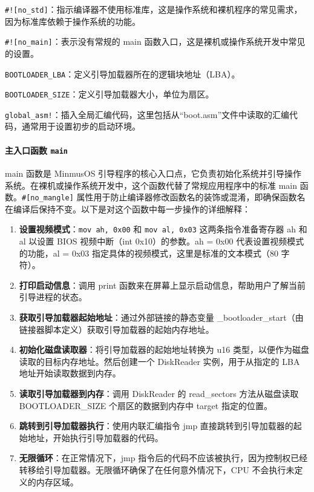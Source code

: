 \texttt{\#![no\_std]}：指示编译器不使用标准库，这是操作系统和裸机程序的常见需求，因为标准库依赖于操作系统的功能。

\texttt{\#![no\_main]}：表示没有常规的 main 函数入口，这是裸机或操作系统开发中常见的设置。

\texttt{BOOTLOADER\_LBA}：定义引导加载器所在的逻辑块地址（LBA）。

\texttt{BOOTLOADER\_SIZE}：定义引导加载器大小，单位为扇区。

\texttt{global\_asm!}：插入全局汇编代码，这里包括从“boot.asm”文件中读取的汇编代码，通常用于设置初步的启动环境。

\paragraph{主入口函数 \texttt{main}}

main 函数是 MinmusOS 引导程序的核心入口点，它负责初始化系统并引导操作系统。在裸机或操作系统开发中，这个函数代替了常规应用程序中的标准 main 函数。\texttt{\#[no\_mangle]} 属性用于防止编译器修改函数名的装饰或混淆，即确保函数名在编译后保持不变。以下是对这个函数中每一步操作的详细解释：

\begin{enumerate}
    \item \textbf{设置视频模式}：\texttt{mov ah, 0x00} 和 \texttt{mov al, 0x03} 这两条指令准备寄存器 ah 和 al 以设置 BIOS 视频中断（int 0x10）的参数。ah = 0x00 代表设置视频模式的功能，al = 0x03 指定具体的视频模式，这里是标准的文本模式（80  字符）。
    \item \textbf{打印启动信息}：调用 print 函数来在屏幕上显示启动信息，帮助用户了解当前引导进程的状态。
    \item \textbf{获取引导加载器起始地址}：通过外部链接的静态变量 \_bootloader\_start（由链接器脚本定义）获取引导加载器的起始内存地址。
    \item \textbf{初始化磁盘读取器}：将引导加载器的起始地址转换为 u16 类型，以便作为磁盘读取的目标内存地址。然后创建一个 DiskReader 实例，用于从指定的 LBA 地址开始读取数据到内存。
    \item \textbf{读取引导加载器到内存}：调用 DiskReader 的 read\_sectors 方法从磁盘读取 BOOTLOADER\_SIZE 个扇区的数据到内存中 target 指定的位置。
    \item \textbf{跳转到引导加载器执行}：使用内联汇编指令 jmp 直接跳转到引导加载器的起始地址，开始执行引导加载器的代码。
    \item \textbf{无限循环}：在正常情况下，jmp 指令后的代码不应该被执行，因为控制权已经转移给引导加载器。无限循环确保了在任何意外情况下，CPU 不会执行未定义的内存区域。
\end{enumerate}

